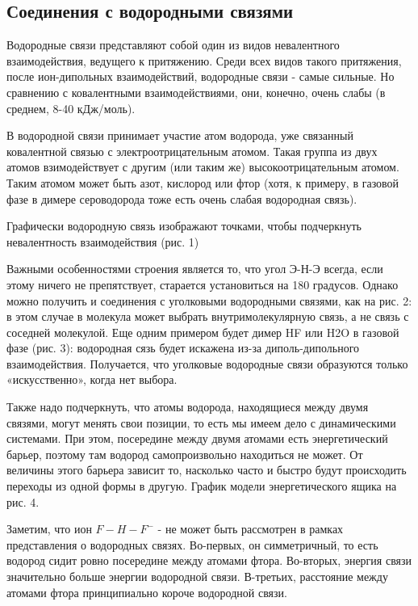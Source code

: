 

\subsection{Соединения с водородными связями}

Водородные связи представляют собой один из видов невалентного взаимодействия, ведущего к притяжению. Среди всех видов такого притяжения, после ион-дипольных
взаимодействий, водородные связи - самые сильные. Но сравнению с ковалентными взаимодействиями, они, конечно, очень слабы (в среднем, 8-40 кДж/моль).

В водородной связи принимает участие атом водорода, уже связанный ковалентной связью с электроотрицательным атомом. Такая группа из двух атомов взимодействует с другим (или
таким же) высокоотрицательным атомом. Таким атомом может быть азот, кислород или фтор (хотя, к примеру, в газовой фазе в димере сероводорода тоже есть очень слабая водородная
связь).

Графически водородную связь изображают точками, чтобы подчеркнуть невалентность взаимодействия (рис. 1)

Важными особенностями строения является то, что угол Э-Н-Э всегда, если этому ничего не препятствует, старается установиться на 180 градусов. Однако можно получить и соединения
с уголковыми водородными связями, как на рис. 2: в этом случае в молекула может выбрать внутримолекулярную связь, а не связь с соседней молекулой. Еще одним примером будет
димер HF или H2O в газовой фазе (рис. 3): водородная сязь будет искажена из-за диполь-дипольного взаимодействия. Получается, что уголковые водородные связи образуются только
«искусственно», когда нет выбора. 

Также надо подчеркнуть, что атомы водорода, находящиеся между двумя связями, могут менять свои позиции, то есть мы имеем дело с динамическими системами. При этом,
посередине между двумя атомами есть энергетический барьер, поэтому там водород самопроизвольно находиться не может. От величины этого барьера зависит то, насколько часто и
быстро будут происходить переходы из одной формы в другую. График модели энергетического ящика на рис. 4. 

Заметим, что ион $F-H-F^-$ - не может быть рассмотрен в рамках представления о водородных связях. Во-первых, он симметричный, то есть водород сидит ровно посередине между
атомами фтора. Во-вторых, энергия связи значительно больше энергии водородной связи. В-третьих, расстояние между атомами фтора принципиально короче водородной связи.

